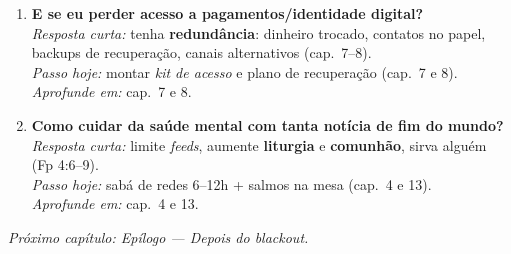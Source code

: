 \begin{enumerate}[leftmargin=*,label=\textbf{P\arabic*.}]
\item \textbf{E se eu perder acesso a pagamentos/identidade digital?}\\
\textit{Resposta curta:} tenha \textbf{redundância}: dinheiro trocado, contatos no papel, backups de recuperação, canais alternativos (cap.~7--8).\\
\textit{Passo hoje:} montar \emph{kit de acesso} e plano de recuperação (cap.~7 e 8).\\
\textit{Aprofunde em:} cap.~7 e 8.

\item \textbf{Como cuidar da saúde mental com tanta notícia de fim do mundo?}\\
\textit{Resposta curta:} limite \emph{feeds}, aumente \textbf{liturgia} e \textbf{comunhão}, sirva alguém (Fp 4:6--9).\\
\textit{Passo hoje:} sabá de redes 6--12h + salmos na mesa (cap.~4 e 13).\\
\textit{Aprofunde em:} cap.~4 e 13.
\end{enumerate}

\bigskip
\noindent\textit{Próximo capítulo: Epílogo — Depois do blackout.}
